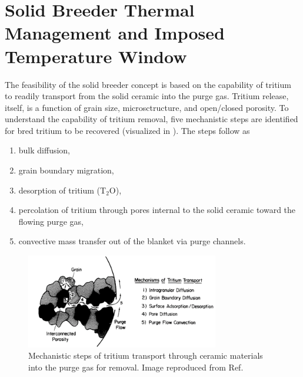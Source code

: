 \FloatBarrier
\section{Solid Breeder Thermal Management and Imposed Temperature Window}

The feasibility of the solid breeder concept is based on the capability of tritium to readily transport from the solid ceramic into the purge gas. Tritium release, itself, is a function of grain size, microsctructure, and open/closed porosity. To understand the capability of tritium removal, five mechanistic steps are identified for bred tritium to be recovered (visualized in ). The steps follow as\cite{Clemmer1980}
\begin{enumerate}
\item bulk diffusion,
\item grain boundary migration,
\item desorption of tritium (T$_2$O),
\item percolation of tritium through pores internal to the solid ceramic toward the flowing purge gas,
\item convective mass transfer out of the blanket via purge channels.
\end{enumerate}

\begin{figure}[ht]
	\centering
	\includegraphics[width=0.75\textwidth]{figures/mechanisms_tritium_transport} 
	\caption{Mechanistic steps of tritium transport through ceramic materials into the purge gas for removal. Image reproduced from Ref.\cite{hastings1989fabrication}}
	\label{fig:mechanisms_tritium_transport}
\end{figure}

